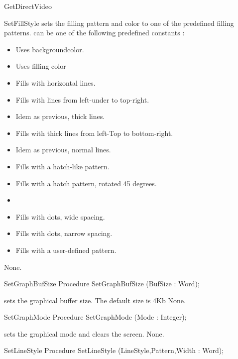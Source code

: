 \begin{function}{GetDirectVideo}
\begin{procedure}{SetFillStyle}
\Description
{} sets the filling pattern and color to one of the
predefined filling patterns.  can be one of the following predefined
constants :
\begin{itemize}
\item {} Uses backgroundcolor.
\item {} Uses filling color
\item {} Fills with horizontal lines.
\item {} Fills with lines from left-under to top-right.
\item {} Idem as previous, thick lines.
\item {} Fills with thick lines from left-Top to bottom-right.
\item {} Idem as previous, normal lines.
\item {}  Fills with a hatch-like pattern.
\item {} Fills with a hatch pattern, rotated 45 degrees.
\item {} 
\item {} Fills with dots, wide spacing.
\item {} Fills with dots, narrow spacing.
\item {} Fills with a user-defined pattern.
\end{itemize}

\Errors
None.
\SeeAlso
{}
\end{procedure}
\begin{procedure}{SetGraphBufSize}
\Declaration
Procedure SetGraphBufSize (BufSize : Word);

\Description
{} 
sets the graphical buffer size. The default size is 4Kb
\Errors
None.
\SeeAlso

\end{procedure}
\begin{procedure}{SetGraphMode}
\Declaration
Procedure SetGraphMode (Mode : Integer);

\Description
{} sets the
graphical mode and clears the screen.
\Errors
None.
\SeeAlso
{}
\end{procedure}
\begin{procedure}{SetLineStyle}
\Declaration
Procedure SetLineStyle (LineStyle,Pattern,Width :
Word);


\end{procedure}
\end{function}

